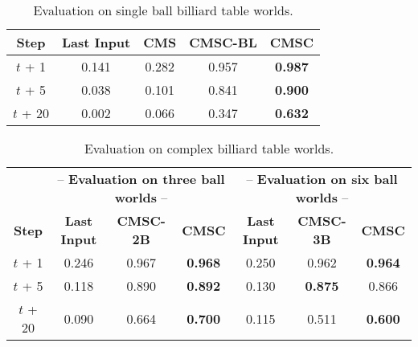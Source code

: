   \begin{table}[h]
  \setlength{\tabcolsep}{3pt}
  \centering
  \begin{tabular}{@{}ccccc@{}}\\
    \toprule
    \textbf{Step}  &\textbf{Last Input} &\textbf{CMS} &\textbf{CMSC-BL} &\textbf{CMSC}  \\
    \hline 
    $t$ + 1      &0.141 &0.282 & 0.957  &\textbf{0.987} \\
    $t$ + 5      &0.038 &0.101 & 0.841  &\textbf{0.900} \\
    $t$ + 20     &0.002 &0.066 & 0.347  &\textbf{0.632} \\
    \bottomrule
  \end{tabular}
  \caption{Evaluation on single ball billiard table worlds.}
  \label{bf_one}
\end{table}

 \begin{table*}[t]
  \centering
  \begin{tabular}{@{}ccccccc@{}}\\
\toprule
    & \multicolumn{3}{c}{ -- {\bf Evaluation on three ball worlds} -- } & \multicolumn{3}{c}{ -- {\bf Evaluation on six ball worlds} -- }                \\
     \textbf{Step} & \textbf{Last Input} & \textbf{CMSC-2B}  & \textbf{CMSC} & \textbf{Last Input} & \textbf{CMSC-3B}  & \textbf{CMSC}  \\
    \hline 
    $t$ + 1      &0.246  &0.967 &\textbf{0.968} &0.250  &0.962 &\textbf{0.964} \\
    $t$ + 5      &0.118  &0.890 &\textbf{0.892} &0.130  &\textbf{0.875} &0.866\\
    $t$ + 20     &0.090  &0.664 &\textbf{0.700} &0.115  &0.511 &\textbf{0.600}\\
    \bottomrule
  \end{tabular}
    \caption{Evaluation on complex billiard table worlds.}
  \label{bf_mult}
\end{table*}

